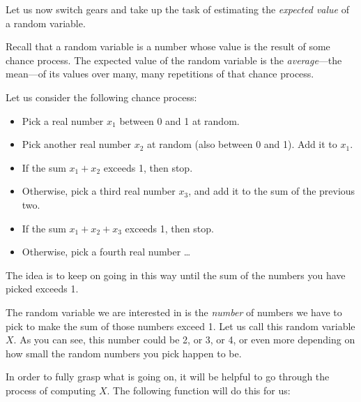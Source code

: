 \documentclass[]{book}
\providecommand{\tightlist}{%
  \setlength{\itemsep}{0pt}\setlength{\parskip}{0pt}}
\theoremstyle{definition}
\theoremstyle{definition}
\theoremstyle{remark}
\begin{document}
{Let us now switch gears and take up the task of estimating the
\emph{expected value} of a random variable.

Recall that a random variable is a number whose value is the result of
some chance process. The expected value of the random variable is the
\emph{average}---the mean---of its values over many, many repetitions of
that chance process.

Let us consider the following chance process:

\begin{itemize}
\tightlist
\item
  Pick a real number \(x_1\) between 0 and 1 at random.
\item
  Pick another real number \(x_2\) at random (also between 0 and 1). Add
  it to \(x_1\).
\item
  If the sum \(x_1 + x_2\) exceeds 1, then stop.
\item
  Otherwise, pick a third real number \(x_3\), and add it to the sum of
  the previous two.
\item
  If the sum \(x_1+x_2+x_3\) exceeds 1, then stop.
\item
  Otherwise, pick a fourth real number \ldots{}
\end{itemize}

The idea is to keep on going in this way until the sum of the numbers
you have picked exceeds 1.

The random variable we are interested in is the \emph{number} of numbers
we have to pick to make the sum of those numbers exceed 1. Let us call
this random variable \(X\). As you can see, this number could be 2, or
3, or 4, or even more depending on how small the random numbers you pick
happen to be.

In order to fully grasp what is going on, it will be helpful to go
through the process of computing \(X\). The following function will do
this for us:

}
\end{document}
